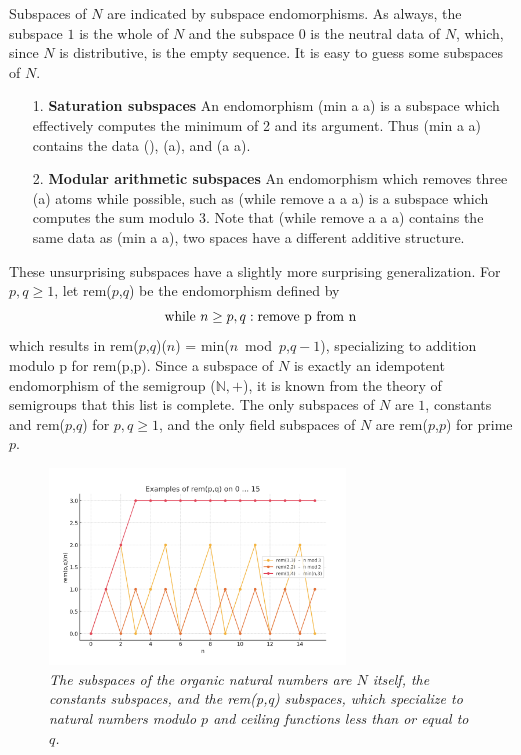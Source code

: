 \documentclass[11pt]{article}
\begin{document}
    Subspaces of $N$ are indicated by subspace endomorphisms.  As always, the subspace $1$ is the whole of $N$ and the subspace $0$ is the neutral data of $N$, which, 
since $N$ is distributive, is the empty sequence.  It is easy to guess some subspaces of $N$.
\begin{itemize} 
\item [1.] {\bf Saturation subspaces} An endomorphism (min a a) is a subspace which effectively computes the minimum of 2 and its argument.  Thus (min a a) contains the data (), (a), and (a a). 
\item [2.] {\bf Modular arithmetic subspaces} An endomorphism which removes three (a) atoms while possible, such as (while remove a a a) is a subspace which computes the sum modulo 3.  Note 
that (while remove a a a) contains the same data as (min a a), two spaces have a different additive structure.  
\end{itemize}
These unsurprising subspaces have a slightly more surprising generalization.  For $p,q\ge 1$, let rem($p$,$q$) be the endomorphism defined by 
\begin{equation}
{\rm while}\ n\ge p,q: {\rm remove\ p\ from\ n}
\end{equation}
which results in rem($p$,$q$)($n$) = min($n$\ mod\ $p$,$q-1$), specializing to addition modulo p for rem(p,p).  Since a subspace of $N$ is exactly an idempotent 
endomorphism of the semigroup (${\mathbb N},+$), it is known from the theory of semigroups that this list is complete\cite{semigroup}.  The only subspaces of $N$ are $1$, constants and rem($p$,$q$) for $p,q\ge 1$, and the only field subspaces of $N$ are rem($p$,$p$) for prime $p$. 

\begin{figure}[h]
\centering
\includegraphics[width=0.7\textwidth]{rem.png}
\caption{{\it The subspaces of the organic natural numbers are $N$ itself, the constants subspaces, and the rem(p,q) subspaces, 
which specialize to natural numbers modulo $p$ and ceiling functions less than or equal to $q$.}} 
\end{figure}
\end{document}
